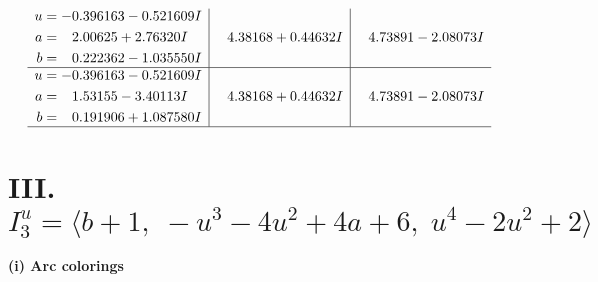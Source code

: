 \documentclass[1p]{elsarticle_modified}
\theoremstyle{definition}
\begin{document}
$$\begin{array}{c|c|c}
\begin{aligned}
u &= -0.396163 - 0.521609 I \\
a &= \phantom{-}2.00625 + 2.76320 I \\
b &= \phantom{-}0.222362 - 1.035550 I\end{aligned}
 & \phantom{-}4.38168 + 0.44632 I & \phantom{-}4.73891 - 2.08073 I \\ \hline\begin{aligned}
u &= -0.396163 - 0.521609 I \\
a &= \phantom{-}1.53155 - 3.40113 I \\
b &= \phantom{-}0.191906 + 1.087580 I\end{aligned}
 & \phantom{-}4.38168 + 0.44632 I & \phantom{-}4.73891 - 2.08073 I\\
 \hline 
 \end{array}$$\newpage\newpage\renewcommand{\arraystretch}{1}
\centering \section*{III. $I^u_{3}= \langle b+1,\;- u^3-4 u^2+4 a+6,\;u^4-2 u^2+2 \rangle$}
\flushleft \textbf{(i) Arc colorings}\\
\end{document}
